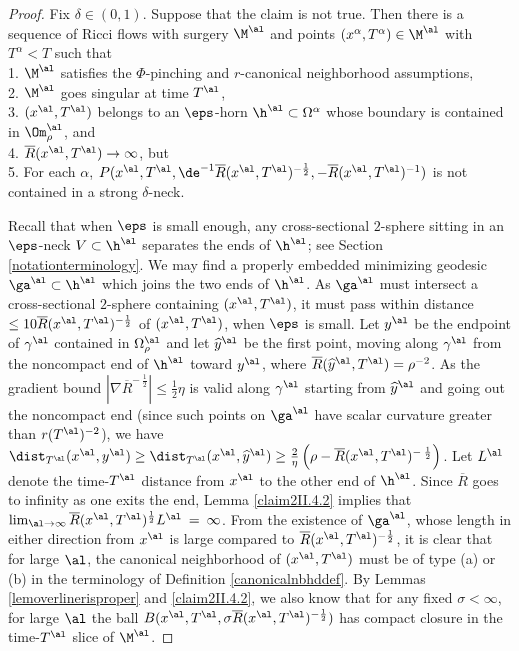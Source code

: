 \begin{proof}
Fix $\delta \in (0,1)$. Suppose that the claim is not true.
Then there is a sequence of
Ricci flows with surgery $\M^\al$  and points $(x^\alpha, T^\alpha) \in
\M^\al$ with $T^\alpha < \widehat{T}$ such that \\
1. $\M^\al$ satisfies
the $\Phi$-pinching
and $r$-canonical neighborhood assumptions, \\
2. $\M^\al$ goes singular at time $T^\al$,\\
3. $(x^\al,T^\al)$ belongs to an $\eps$-horn $\h^\al\subset \Omega^\alpha$
whose boundary is contained in $\Om_\rho^\al$, and \\
4. $\overline{R}(x^\al,T^\al) \rightarrow \infty$, but \\
5. For each $\alpha$,
 $P(x^\al,T^\al,\de^{-1}\overline{R}(x^\al,T^\al)^{-\frac12},
 -\overline{R}(x^\al,T^\al)^{-1})$
is not contained in a strong $\delta$-neck.

Recall that when $\eps$ is small enough, any cross-sectional $2$-sphere
sitting in an $\eps$-neck $V\subset \h^\al$
separates the ends of $\h^\al$;
see Section \ref{notationterminology}.  We may
find a properly embedded minimizing geodesic $\ga^\al\subset \h^\al$
which joins the two
ends of $\h^\al$.   As $\ga^\al$ must intersect a cross-sectional
$2$-sphere containing $(x^\al,T^\al)$, it must pass within distance
$\leq 10\overline{R}(x^\al,T^\al)^{-\frac12}$ of $(x^\al,T^\al)$,
when $\eps$ is small.
Let $y^\al$ be the endpoint of $\gamma^\al$ contained in
$\Omega^\al_\rho$ and let $\widehat{y}^\al$ be the first point,
moving along $\gamma^\al$ from the noncompact end of $\h^\al$
toward $y^\al$,
where $\overline{R}(\widehat{y}^\al, T^\al) = \rho^{-2}$. As the gradient bound
$|\nabla \overline{R}^{- \: \frac12}| \le \frac12 \eta$ is valid along
$\gamma^\al$ starting from $\widehat{y}^\al$ and going out the noncompact end
(since such points on $\ga^\al$ have scalar curvature greater than
$r(T^\al)^{-2}$), we have $\dist_{T^\al}(x^\al, y^\al) \ge
\dist_{T^\al}(x^\al, \widehat{y}^\al) \ge \frac{2}{\eta}
\left(\rho - \overline{R}(x^\al, T^\al)^{- \: \frac12} \right)$.
Let $L^\al$ denote the time-$T^\al$ distance from $x^\al$ to the other
end of $\h^\al$. Since $\overline{R}$ goes to infinity as one exits the end,
Lemma \ref{claim2II.4.2} implies that $\lim_{\al \rightarrow \infty}
\overline{R}(x^\al, T^\al)^{\frac12} L^\al \: = \: \infty$.
From the existence of $\ga^\al$, whose length in either direction from
$x^\al$ is large compared to $\overline{R}(x^\al, T^\al)^{-\frac12}$,
it is clear that for large $\al$,
the canonical neighborhood of $(x^\al, T^\al)$ must be
of type (a) or (b) in the terminology of Definition \ref{canonicalnbhddef}.
By Lemmas \ref{lemoverlinerisproper} and \ref{claim2II.4.2},
we also know that for any fixed $\sigma < \infty$, for large
$\al$ the ball $B(x^\al, T^\al, \sigma \overline{R}(x^\al, T^\al)^{-\frac12})$
has compact closure in the time-$T^\al$ slice of $\M^\al$.


\end{proof}

